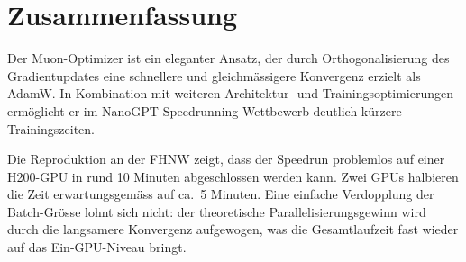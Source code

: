 \section{Zusammenfassung}

Der Muon-Optimizer ist ein eleganter Ansatz, der durch Orthogonalisierung des Gradientupdates eine schnellere und gleichmässigere Konvergenz erzielt als AdamW.
In Kombination mit weiteren Architektur- und Trainingsoptimierungen ermöglicht er im NanoGPT-Speedrunning-Wettbewerb deutlich kürzere Trainingszeiten.

Die Reproduktion an der FHNW zeigt, dass der Speedrun problemlos auf einer H200-GPU in rund 10 Minuten abgeschlossen werden kann.
Zwei GPUs halbieren die Zeit erwartungsgemäss auf ca.\ 5 Minuten.
Eine einfache Verdopplung der Batch-Grösse lohnt sich nicht: der theoretische Parallelisierungsgewinn wird durch die langsamere Konvergenz aufgewogen, was die Gesamtlaufzeit fast wieder auf das Ein-GPU-Niveau bringt.
